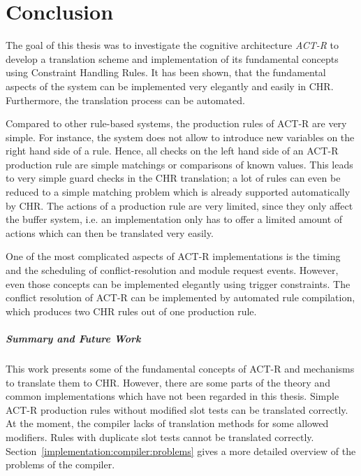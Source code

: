 \chapter{Conclusion}
\label{conclusion}

The goal of this thesis was to investigate the cognitive architecture \emph{ACT-R} to develop a translation scheme and implementation of its fundamental concepts using Constraint Handling Rules. It has been shown, that the fundamental aspects of the system can be implemented very elegantly and easily in CHR. Furthermore, the translation process can be automated. 

Compared to other rule-based systems, the production rules of ACT-R are very simple. For instance, the system does not allow to introduce new variables on the right hand side of a rule. Hence, all checks on the left hand side of an ACT-R production rule are simple matchings or comparisons of known values. This leads to very simple guard checks in the CHR translation; a lot of rules can even be reduced to a simple matching problem which is already supported automatically by CHR. The actions of a production rule are very limited, since they only affect the buffer system, i.e. an implementation only has to offer a limited amount of actions which can then be translated very easily.

One of the most complicated aspects of ACT-R implementations is the timing and the scheduling of conflict-resolution and module request events. However, even those concepts can be implemented elegantly using trigger constraints. The conflict resolution of ACT-R can be implemented by automated rule compilation, which produces two CHR rules out of one production rule.

\paragraph{Summary and Future Work}

This work presents some of the fundamental concepts of ACT-R and mechanisms to translate them to CHR. However, there are some parts of the theory and common implementations which have not been regarded in this thesis. Simple ACT-R production rules without modified slot tests can be translated correctly. At the moment, the compiler lacks of translation methods for some allowed modifiers. Rules with duplicate slot tests cannot be translated correctly. Section~\ref{implementation:compiler:problems} gives a more detailed overview of the problems of the compiler.


